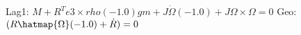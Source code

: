 
Lag1: $M+R^{T} e3\times rho (-1.0) g m+J \dot{\Omega } (-1.0)+J \Omega \times \Omega  = 0$
Geo: $(R \hatmap{\Omega } (-1.0)+\dot{R}) = 0$